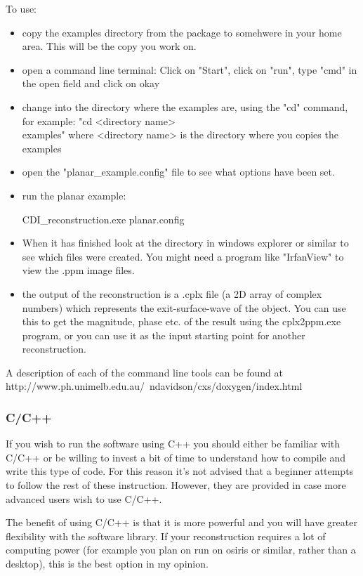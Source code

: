 \documentclass[]{cxs-software}
\begin{document}
To use:
\begin{itemize}
\item copy the examples directory from the package to somehwere in
  your home area. This will be the copy you work on.
\item open a command line terminal: Click on "Start", click on "run",
  type "cmd" in the open field and click on okay
\item change into the directory where the examples are, using the "cd"
  command, for example: "cd <directory name>\\examples" where
  <directory name> is the directory where you copies the examples
\item open the "planar\_example.config" file to see what options have
  been set.
\item run the planar example: 
  \begin{myverbatim}
    CDI_reconstruction.exe planar.config
  \end{myverbatim}
\item When it has finished look at the directory in windows explorer
  or similar to see which files were created. You might need a program
  like "IrfanView" to view the .ppm image files.
\item the output of the reconstruction is a .cplx file (a 2D array of
  complex numbers) which represents the exit-surface-wave of the
  object. You can use this to get the magnitude, phase etc. of the
  result using the cplx2ppm.exe program, or you can use it as the
  input starting point for another reconstruction.
\end{itemize}

A description of each of the command line tools can be found at
http://www.ph.unimelb.edu.au/~ndavidson/cxs/doxygen/index.html



\subsubsection{C/C++}

If you wish to run the software using C++ you should either be
familiar with C/C++ or be willing to invest a bit of time to
understand how to compile and write this type of code. For this reason
it's not advised that a beginner attempts to follow the rest of these
instruction. However, they are provided in case more advanced users
wish to use C/C++.

The benefit of using C/C++ is that it is more powerful and you will
have greater flexibility with the software library.  If your
reconstruction requires a lot of computing power (for example you plan
on run on osiris or similar, rather than a desktop), this is the best
option in my opinion.
\end{document}
